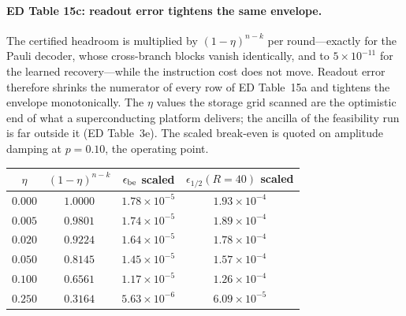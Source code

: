 \documentclass[10pt,a4paper]{article}
\begin{document}
\paragraph*{ED Table 15c: readout error tightens the same envelope.}
The certified headroom is multiplied by $(1-\eta)^{n-k}$ per round---exactly for the
Pauli decoder, whose cross-branch blocks vanish identically, and to $5\times10^{-11}$
for the learned recovery---while the instruction cost does not move.  Readout error
therefore shrinks the numerator of every row of ED Table~15a and tightens the
envelope monotonically.  The $\eta$ values the storage grid scanned are the
optimistic end of what a superconducting platform delivers; the ancilla of the
feasibility run is far outside it (ED Table~3e).  The scaled break-even is quoted on
amplitude damping at $p=0.10$, the operating point.
\begin{longtable}{cccc}
\toprule $\eta$ & $(1-\eta)^{n-k}$ & $\epsilon_{\rm be}$ scaled & $\epsilon_{1/2}(R{=}40)$ scaled \\ \midrule
$0.000$ & $1.0000$ & $1.78\times 10^{-5}$ & $1.93\times 10^{-4}$ \\
$0.005$ & $0.9801$ & $1.74\times 10^{-5}$ & $1.89\times 10^{-4}$ \\
$0.020$ & $0.9224$ & $1.64\times 10^{-5}$ & $1.78\times 10^{-4}$ \\
$0.050$ & $0.8145$ & $1.45\times 10^{-5}$ & $1.57\times 10^{-4}$ \\
$0.100$ & $0.6561$ & $1.17\times 10^{-5}$ & $1.26\times 10^{-4}$ \\
$0.250$ & $0.3164$ & $5.63\times 10^{-6}$ & $6.09\times 10^{-5}$ \\
\bottomrule\end{longtable}
\end{document}
